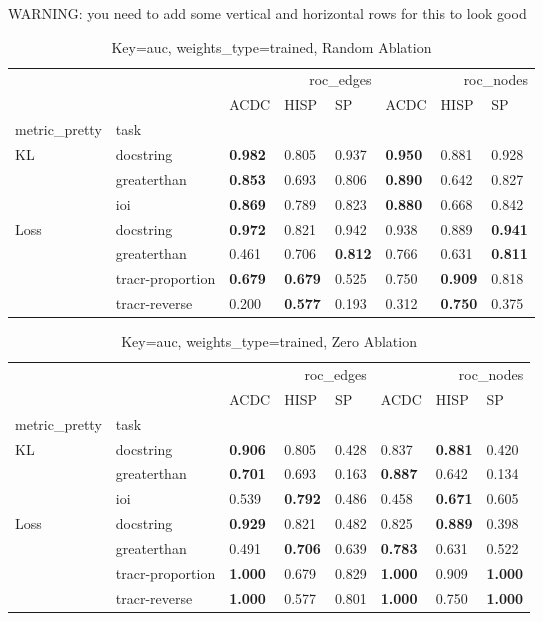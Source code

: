 \documentclass{article}
\begin{document}
WARNING: you need to add some vertical and horizontal rows for this to look good

\begin{table}
\caption{Key=auc, weights\_type=trained, Random Ablation}
\begin{tabular}{llllllll}
\toprule
 &  & \multicolumn{3}{r}{roc\_edges} & \multicolumn{3}{r}{roc\_nodes} \\
 &  & ACDC & HISP & SP & ACDC & HISP & SP \\
metric\_pretty & task &  &  &  &  &  &  \\
\midrule
\multirow[c]{3}{*}{KL} & docstring & \textbf{0.982} & 0.805 & 0.937 & \textbf{0.950} & 0.881 & 0.928 \\
 & greaterthan & \textbf{0.853} & 0.693 & 0.806 & \textbf{0.890} & 0.642 & 0.827 \\
 & ioi & \textbf{0.869} & 0.789 & 0.823 & \textbf{0.880} & 0.668 & 0.842 \\
\multirow[c]{4}{*}{Loss} & docstring & \textbf{0.972} & 0.821 & 0.942 & 0.938 & 0.889 & \textbf{0.941} \\
 & greaterthan & 0.461 & 0.706 & \textbf{0.812} & 0.766 & 0.631 & \textbf{0.811} \\
 & tracr-proportion & \textbf{0.679} & \textbf{0.679} & 0.525 & 0.750 & \textbf{0.909} & 0.818 \\
 & tracr-reverse & 0.200 & \textbf{0.577} & 0.193 & 0.312 & \textbf{0.750} & 0.375 \\
\bottomrule
\end{tabular}
\end{table}
\begin{table}
\caption{Key=auc, weights\_type=trained, Zero Ablation}
\begin{tabular}{llllllll}
\toprule
 &  & \multicolumn{3}{r}{roc\_edges} & \multicolumn{3}{r}{roc\_nodes} \\
 &  & ACDC & HISP & SP & ACDC & HISP & SP \\
metric\_pretty & task &  &  &  &  &  &  \\
\midrule
\multirow[c]{3}{*}{KL} & docstring & \textbf{0.906} & 0.805 & 0.428 & 0.837 & \textbf{0.881} & 0.420 \\
 & greaterthan & \textbf{0.701} & 0.693 & 0.163 & \textbf{0.887} & 0.642 & 0.134 \\
 & ioi & 0.539 & \textbf{0.792} & 0.486 & 0.458 & \textbf{0.671} & 0.605 \\
\multirow[c]{4}{*}{Loss} & docstring & \textbf{0.929} & 0.821 & 0.482 & 0.825 & \textbf{0.889} & 0.398 \\
 & greaterthan & 0.491 & \textbf{0.706} & 0.639 & \textbf{0.783} & 0.631 & 0.522 \\
 & tracr-proportion & \textbf{1.000} & 0.679 & 0.829 & \textbf{1.000} & 0.909 & \textbf{1.000} \\
 & tracr-reverse & \textbf{1.000} & 0.577 & 0.801 & \textbf{1.000} & 0.750 & \textbf{1.000} \\
\bottomrule
\end{tabular}
\end{table}
\end{document}
